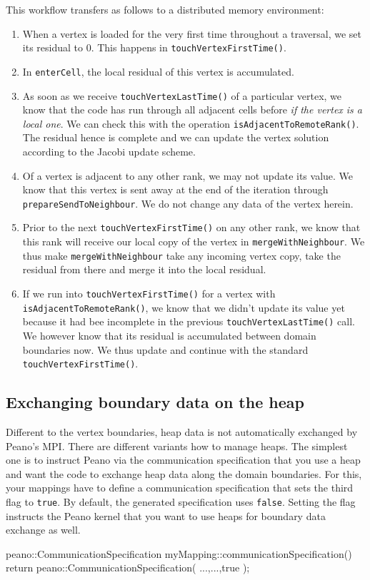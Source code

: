 \noindent
This workflow transfers as follows to a distributed memory environment:
\begin{enumerate}
  \item When a vertex is loaded for the very first time throughout a traversal,
  we set its residual to $0$. This happens in \texttt{touchVertexFirstTime()}.
  \item In \texttt{enterCell}, the local residual of this vertex is accumulated.
  \item As soon as we receive \texttt{touchVertexLastTime()} of a particular
  vertex, we know that the code has run through all adjacent cells before {\em
  if the vertex is  a local one}. We can check this with the operation
  \texttt{isAdjacentToRemoteRank()}. The residual hence is complete and we can update the
  vertex solution according to the Jacobi update scheme.
  \item Of a vertex is adjacent to any other rank, we may not update its value.
  We know that this vertex is sent away at the end of the iteration through 
  \texttt{prepareSendToNeighbour}. We do not change any data of the vertex
  herein.
  \item Prior to the next \texttt{touchVertexFirstTime()} on any other rank, we
  know that this rank will receive our local copy of the vertex in
  \texttt{mergeWithNeighbour}. We thus make \linebreak
  \texttt{mergeWithNeighbour} take any
  incoming vertex copy, take the residual from there and merge it into the local
  residual.
  \item If we run into \texttt{touchVertexFirstTime()} for a vertex with
  \texttt{isAdjacentToRemoteRank()}, we know that we didn't update its value yet
  because it had bee incomplete in the previous \texttt{touchVertexLastTime()}
  call. We however know that its residual is accumulated between domain
  boundaries now. We thus update and continue with the standard \linebreak
  \texttt{touchVertexFirstTime()}.
\end{enumerate}



\subsection{Exchanging boundary data on the heap}

Different to the vertex boundaries, heap data is not automatically exchanged by
Peano's MPI. 
There are different variants how to manage heaps. 
The simplest one is to instruct Peano via the communication specification that
you use a heap and want the code to exchange heap data along the domain
boundaries.
For this, your mappings have to define a communication specification
that sets the third flag to \texttt{true}.
By default, the generated specification uses \texttt{false}. 
Setting the flag instructs the Peano kernel that you want to use
heaps for boundary data exchange as well.
\begin{code}
peano::CommunicationSpecification  
myMapping::communicationSpecification() { 
  return peano::CommunicationSpecification( ...,...,true );
}
\end{code}

